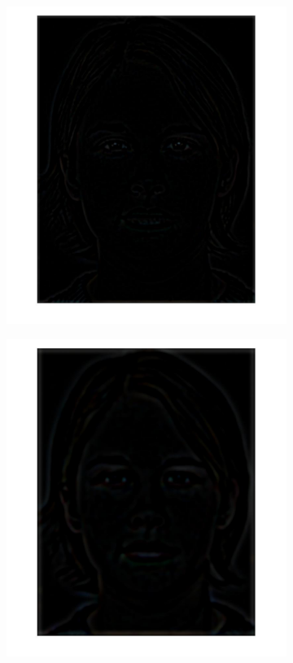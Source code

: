 \documentclass[a4paper]{iacas}
\begin{document}
\begin{figure}[!htbp]
\begin{subfigure}[b]{0.15\textwidth}
		\includegraphics[width=\textwidth]{402.jpg}
		\caption{}
		\label{fig:402}
	\end{subfigure}
	\begin{subfigure}[b]{0.15\textwidth}
		\includegraphics[width=\textwidth]{403.jpg}

\end{subfigure}
\end{figure}
\end{document}
